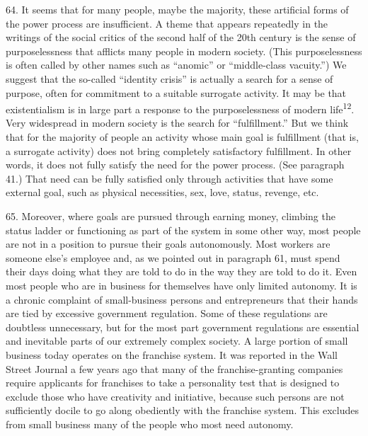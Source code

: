 \documentclass{article}
\begin{document}
64. It seems that for many people, maybe the majority, these artificial forms of the power process 
are insufficient. A theme that appears repeatedly in the writings of the social critics of the second 
half of the 20th century is the sense of purposelessness that afflicts many people in modern 
society. (This purposelessness is often called by other names such as “anomic” or “middle-class 
vacuity.”) We suggest that the so-called “identity crisis” is actually a search for a sense of purpose, 
often for commitment to a suitable surrogate activity. It may be that existentialism is in large part 
a response to the purposelessness of modern life\textsuperscript{12}. Very widespread in modern society is the search 
for “fulfillment.” But we think that for the majority of people an activity whose main goal is 
fulfillment (that is, a surrogate activity) does not bring completely satisfactory fulfillment. In other 
words, it does not fully satisfy the need for the power process. (See paragraph 41.) That need can 
be fully satisfied only through activities that have some external goal, such as physical necessities, 
sex, love, status, revenge, etc. \vspace{\baselineskip}

65. Moreover, where goals are pursued through earning money, climbing the status ladder or 
functioning as part of the system in some other way, most people are not in a position to pursue 
their goals autonomously. Most workers are someone else’s employee and, as we pointed out in 
paragraph 61, must spend their days doing what they are told to do in the way they are told to do 
it. Even most people who are in business for themselves have only limited autonomy. It is a 
chronic complaint of small-business persons and entrepreneurs that their hands are tied by 
excessive government regulation. Some of these regulations are doubtless unnecessary, but for 
the most part government regulations are essential and inevitable parts of our extremely complex 
society. A large portion of small business today operates on the franchise system. It was reported 
in the Wall Street Journal a few years ago that many of the franchise-granting companies require 
applicants for franchises to take a personality test that is designed to exclude those who have 
creativity and initiative, because such persons are not sufficiently docile to go along obediently 
with the franchise system. This excludes from small business many of the people who most need 
autonomy. \vspace{\baselineskip}
\end{document}
